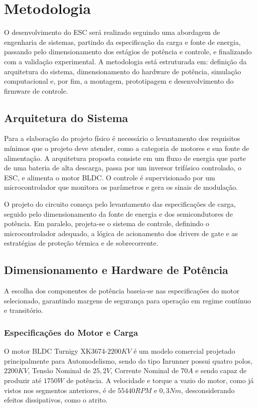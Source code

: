 \chapter{Metodologia}
O desenvolvimento do ESC será realizado seguindo uma abordagem de engenharia de sistemas, partindo da especificação da carga e fonte de energia, passando pelo dimensionamento dos estágios de potência e controle, e finalizando com a validação experimental. A metodologia está estruturada em: definição da arquitetura do sistema, dimensionamento do hardware de potência, simulação computacional e, por fim, a montagem, prototipagem e desenvolvimento do firmware de controle.

\section{Arquitetura do Sistema}
Para a elaboração do projeto físico é necessário o levantamento dos requisitos mínimos que o projeto deve atender, como a categoria de motores e sua fonte de alimentação. A arquitetura proposta consiste em um fluxo de energia que parte de uma bateria de alta descarga, passa por um inversor trifásico controlado, o ESC, e alimenta o motor BLDC. O controle é supervisionado por um microcontrolador que monitora os parâmetros e gera os sinais de modulação.

O projeto do circuito começa pelo levantamento das especificações de carga, seguido pelo dimensionamento da fonte de energia e dos semicondutores de potência. Em paralelo, projeta-se o sistema de controle, definindo o microcontrolador adequado, a lógica de acionamento dos drivers de gate e as estratégias de proteção térmica e de sobrecorrente.

\section{Dimensionamento e Hardware de Potência}
A escolha dos componentes de potência baseia-se nas especificações do motor selecionado, garantindo margens de segurança para operação em regime contínuo e transitório.

\subsection{Especificações do Motor e Carga}
O motor BLDC Turnigy XK3674-$2200KV$ é um modelo comercial projetado principalmente para Automodelismo, sendo do tipo Inrunner possui quatro polos, $2200KV$, Tensão Nominal de $25,2V$, Corrente Nominal de $70A$ e sendo capaz de produzir até $1750W$ de potência. A velocidade e torque a vazio do motor, como já vistos nos segmentos anteriores, é de $55440 RPM$ e $0,3 Nm$, desconsiderando efeitos dissipativos, como o atrito.

